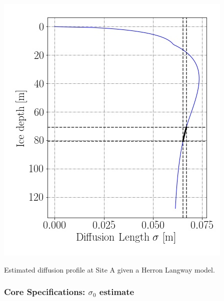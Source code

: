 \documentclass[../../CompleteThesis/Complete_1stDraft.tex]{subfiles}
\begin{document}
\begin{marginfigure}
	\centering
	\includegraphics[width=\marginparwidth]{SiteA_DiffProfile.jpg}
	\caption[Diffusion profile, Site A.]{\footnotesize{Estimated diffusion profile at Site A given a Herron Langway model.}}
	\label{fig:SiteADiffProfile}
\end{marginfigure}

\subsubsection[$\sigma_0$ estimate]{Core Specifications: $\sigma_0$ estimate}
\label{Subsubsec:Method_FirstSigmaEstimate_PrelimComputations_Sigma0Estimate}








 
 
\end{document}
